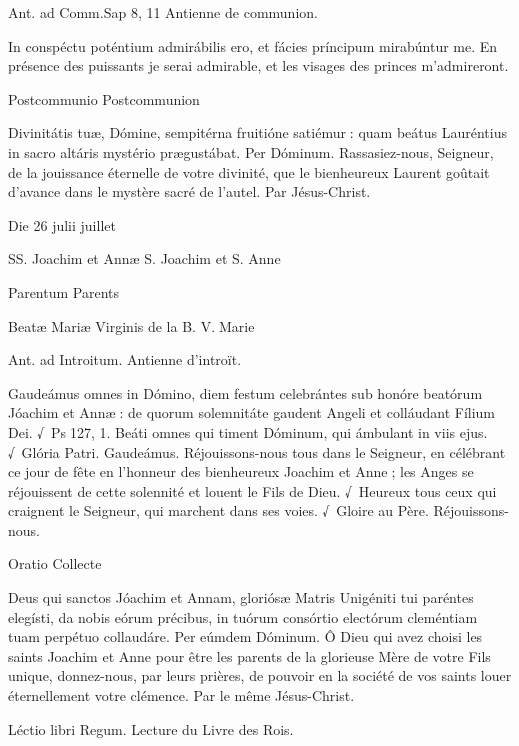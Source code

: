 \begin{paracol}{2}
Ant. ad Comm.\hfill Sap 8, 11
\switchcolumn
Antienne de communion.
\switchcolumn*

In conspéctu poténtium admirábilis ero, et fácies príncipum mirabúntur me.
\switchcolumn
En présence des puissants je serai admirable, et les visages des princes m’admireront.
\switchcolumn*

Postcommunio
\switchcolumn
Postcommunion
\switchcolumn*

Divinitátis tuæ, Dómine, sempitérna  fruitióne satiémur : quam beátus Lauréntius in sacro altáris mystério prægustábat. Per Dóminum.
\switchcolumn
Rassasiez-nous, Seigneur, de la  jouissance éternelle de votre divinité, que le bienheureux Laurent goûtait d’avance dans le mystère sacré de l’autel. Par Jésus-Christ.
\switchcolumn*

Die 26 julii
 juillet
\switchcolumn*

SS. Joachim et Annæ
\switchcolumn
S. Joachim et S. Anne
\switchcolumn*

Parentum
\switchcolumn
Parents
\switchcolumn*

Beatæ Mariæ Virginis
\switchcolumn
de la B. V. Marie
\switchcolumn*

Ant. ad Introitum.
\switchcolumn
Antienne d’introït.
\switchcolumn*

Gaudeámus omnes in Dómino,  diem festum celebrántes sub honóre beatórum Jóachim et Annæ : de quorum solemnitáte gaudent Angeli et colláudant Fílium Dei. √~Ps 127, 1. Beáti omnes qui timent Dóminum, qui ámbulant in viis ejus. √~Glória Patri. Gaudeámus.
\switchcolumn
Réjouissons-nous tous dans le Seigneur,  en célébrant ce jour de fête en l’honneur des bienheureux Joachim et Anne ; les Anges se réjouissent de cette solennité et louent le Fils de Dieu. √~Heureux tous ceux qui craignent le Seigneur, qui marchent dans ses voies. √~Gloire au Père. Réjouissons-nous.
\switchcolumn*

Oratio
\switchcolumn
Collecte
\switchcolumn*

Deus qui sanctos Jóachim et  Annam, gloriósæ Matris Unigéniti tui paréntes elegísti, da nobis eórum précibus, in tuórum consórtio electórum cleméntiam tuam perpétuo collaudáre. Per eúmdem Dóminum.
\switchcolumn
Ô Dieu qui avez choisi les saints Joachim  et Anne pour être les parents de la glorieuse Mère de votre Fils unique, donnez-nous, par leurs prières, de pouvoir en la société de vos saints louer éternellement votre clémence. Par le même Jésus-Christ.
\switchcolumn*

Léctio libri Regum.
\switchcolumn
Lecture du Livre des Rois.
\switchcolumn*


\end{paracol}
